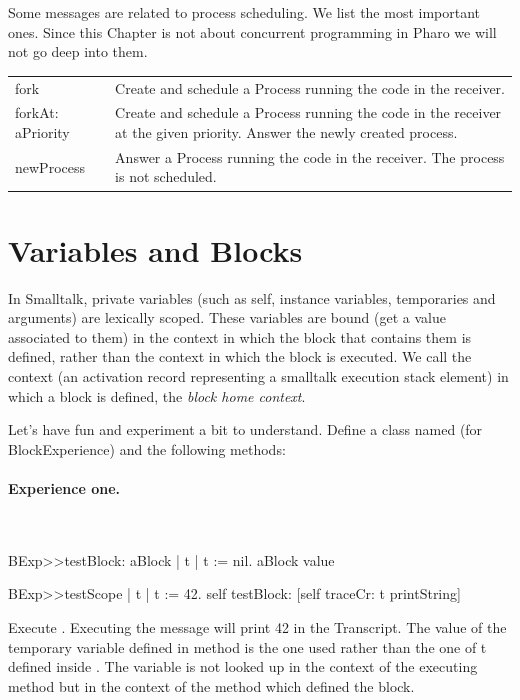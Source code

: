 \documentclass[a4paper,10pt,twoside]{book}
\begin{document}
Some messages are related to process scheduling. We list the most important ones. Since this Chapter is not about concurrent programming in Pharo we will not go deep into them.

\begin{tabular}{p{2.5cm}|p{8cm}}
\textsf{fork}&Create and schedule a Process running the code in the receiver.\\
\textsf{forkAt: aPriority}& Create and schedule a Process running the code in the receiver at the given priority. Answer the newly created process. \\
\textsf{newProcess}&Answer a Process running the code in the receiver. The process is not scheduled.\\
\end{tabular}





\section{Variables and Blocks}
In Smalltalk, private variables (such as self, instance variables, temporaries and arguments) are 
lexically scoped. These variables are bound (get a value associated to them) in the context in which the block that contains them is defined, rather than the context in which the block is executed.  We call the context (an activation record representing a smalltalk execution stack element) in which a block is defined, the \emph{block home context}.


Let's have fun and experiment a bit to understand. 
Define a class named  (for BlockExperience) and the following methods:

\paragraph{Experience one.}\ 

\begin{code}{}
BExp>>testBlock: aBlock 
	| t | 
	t := nil. 
	aBlock value 
	
BExp>>testScope 
	| t | 
	t := 42. 
	self testBlock: [self traceCr: t printString] 
\end{code}

Execute . Executing the  message will print 42 in the Transcript. The value of the temporary variable  defined in method  is the one used rather than the one of t defined inside .
The variable  is not looked up in the context of the executing method  but in the context of the method  which defined the block.
\end{document}
